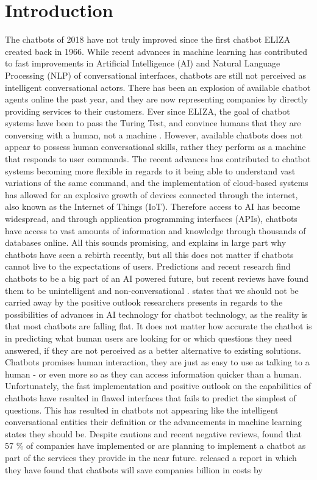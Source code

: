 \chapter{Introduction}
\label{chap:introduction}
The chatbots of 2018 have not truly improved since the first chatbot ELIZA created back in 1966. While recent advances in machine learning has contributed to fast improvements in Artificial Intelligence (AI) and Natural Language Processing (NLP) of conversational interfaces, chatbots are still not perceived as intelligent conversational actors. There has been an explosion of available chatbot agents online the past year, and they are now representing companies by directly providing services to their customers. Ever since ELIZA, the goal of chatbot systems have been to pass the Turing Test, and convince humans that they are conversing with a human, not a machine \citep{McTear2016b}. However, available chatbots does not appear to possess human conversational skills, rather they perform as a machine that responds to user commands. The recent advances has contributed to chatbot systems becoming more flexible in regards to it being able to understand vast variations of the same command, and the implementation of cloud-based systems has allowed for an explosive growth of devices connected through the internet, also known as the Internet of Things (IoT). Therefore access to AI has become widespread, and through application programming interfaces (APIs), chatbots have access to vast amounts of information and knowledge through thousands of databases online. All this sounds promising, and explains in large part why chatbots have seen a rebirth recently, but all this does not matter if chatbots cannot live to the expectations of users.  Predictions and recent research find chatbots to be a big part of an AI powered future, but recent reviews have found them to be unintelligent and non-conversational \citep{stokke2017,orf2017,piltch2017,vincent2017,boutin2017}. \cite{piltch2017} states that we should not be carried away by the positive outlook researchers presents in regards to the possibilities of advances in AI technology for chatbot technology, as the reality is that most chatbots are falling flat. It does not matter how accurate the chatbot is in predicting what human users are looking for or which questions they need answered, if they are not perceived as a better alternative to existing solutions. Chatbots promises human interaction, they are just as easy to use as talking to a human - or even more so as they can access information quicker than a human. Unfortunately, the fast implementation and positive outlook on the capabilities of chatbots have resulted in flawed interfaces that fails to predict the simplest of questions. This has resulted in chatbots not appearing like the intelligent conversational entities their definition or the advancements in machine learning states they should be. Despite cautions and recent negative reviews, \cite{forrester2017}found that 57 \% of companies have implemented or are planning to implement a chatbot as part of the services they provide in the near future. \cite{juniper2017} released a report in which they have found that chatbots will save companies  billion in costs by 
